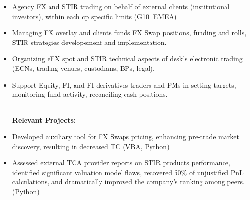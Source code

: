\documentclass[letterpaper,hidelinks]{article}
\newcommand{\resumeItemRoutine}[1]{
  \item[\small\ding{223}]\small{
    {#1 \vspace{-2pt}}
  }
}
\newcommand{\resumeItemProject}[1]{
  \item[\small\ding{51}]\small{
    {#1 \vspace{-2pt}}
  }
}
\newcommand{\resumeItemListStart}{\begin{itemize}}
\newcommand{\resumeItemListEnd}{\end{itemize}\vspace{-5pt}}
\begin{document}
\vspace{1pt}
\resumeItemListStart
\resumeItemRoutine{Agency FX and STIR trading on behalf of external clients (institutional investors), within each cp specific limits (G10, EMEA)}
\resumeItemRoutine{Managing FX overlay and clients funds FX Swap positions, funding and rolls, STIR strategies developement and implementation.}
\resumeItemRoutine{Organizing eFX spot and STIR technical aspects of desk's electronic trading (ECNs, trading venues, custodians, BPs, legal).}
\resumeItemRoutine{Support Equity, FI, and FI derivatives traders and PMs in setting targets, monitoring fund activity, reconciling cash positions.}
\vspace{2pt}\\
\hspace{-13pt}\textbf{Relevant Projects:}
\vspace{-3pt}
\resumeItemProject{Developed auxiliary tool for FX Swaps pricing, enhancing pre-trade market discovery, resulting in decreased TC (VBA, Python)}
\resumeItemProject{Assessed external TCA provider reports on STIR products performance, identified significant valuation model flaws, recovered 50\% of unjustified PnL calculations, and dramatically improved the company's ranking among peers. (Python)}
\resumeItemListEnd
\end{document}
